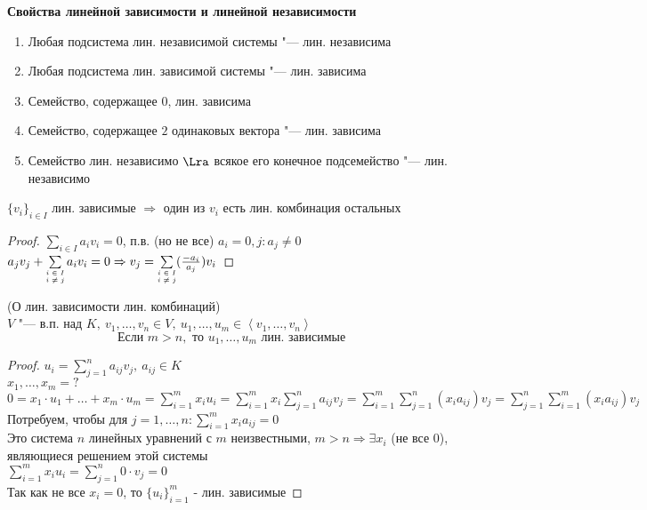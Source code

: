 \textbf{Свойства линейной зависимости и линейной независимости}

\begin{enumerate}
	\item
		Любая подсистема лин. независимой системы "--- лин. независима
	\item
		Любая подсистема лин. зависимой системы "--- лин. зависима
	\item
		Семейство, содержащее $0$, лин. зависима
	\item
		Семейство, содержащее $2$ одинаковых вектора "--- лин. зависима
	\item
		Семейство лин. независимо $\Lra$ всякое его конечное подсемейство "--- лин. независимо
\end{enumerate}

\begin{lemma}
	$\{ v_i \}_{i \in I}$ лин. зависимые $\Rightarrow$ один из $v_i$ есть лин. комбинация остальных
\end{lemma}
\begin{proof}
	$\sum\limits_{i \in I} a_iv_i = 0$, п.в. (но не все) $a_i = 0, j \colon a_j \neq 0$ \\
	$a_jv_j + \sum\limits_{\substack{\text{\tiny{$i \in I $}} \\ \text{\tiny{$i \neq j $}}}} a_iv_i = 0 \Rightarrow v_j = \sum\limits_{\substack{\text{\tiny{$i \in I $}} \\ \text{\tiny{$i \neq j $}}}} (\frac{-a_i}{a_j})v_i$
\end{proof}

\begin{theorem}
	(О лин. зависимости лин. комбинаций) \\
	$V$ "--- в.п. над $K, ~ v_1, \dots, v_n \in V, ~ u_1, \dots, u_m \in \left< v_1, \dots, v_n \right>$ \\
	\[\text{Если } m > n, \text{ то } u_1, \dots, u_m \text{ лин. зависимые}\]
\end{theorem}
\begin{proof}
	$u_i = \sum\limits_{j = 1}^{n} a_{ij}v_j, ~ a_{ij} \in K$ \\
	$x_1, \dots, x_m = ?$ \\
	$0 = x_1 \cdot u_1 + \dots + x_m \cdot u_m = \sum\limits_{i = 1}^{m} x_iu_i = \sum\limits_{i = 1}^{m} x_i \sum\limits_{j = 1}^{n} a_{ij}v_j = \sum\limits_{i = 1}^{m} \sum\limits_{j = 1}^{n} (x_ia_{ij})v_j = \sum\limits_{j = 1}^{n} \sum\limits_{i = 1}^{m} (x_ia_{ij})v_j$ \\
	Потребуем, чтобы для $j = 1, \dots, n \colon \sum\limits_{i = 1}^{m} x_ia_{ij} = 0$ \\
	Это система $n$ линейных уравнений с $m$ неизвестными, $m > n \Rightarrow \exists x_i$ (не все $0$), являющиеся решением этой системы \\
	$\sum\limits_{i = 1}^{m} x_iu_i = \sum\limits_{j = 1}^{n} 0 \cdot v_j = 0$ \\
	Так как не все $x_i = 0$, то $\{u_i\}_{i = 1}^{m}$ - лин. зависимые
\end{proof}